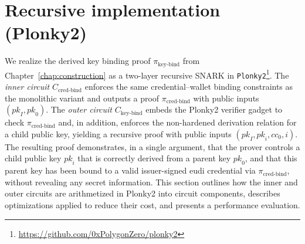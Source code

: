 \section{Recursive implementation (Plonky2)}
\label{sec:recursive-plonky2}
We realize the derived key binding proof $\pi_{\text{key-bind}}$ from Chapter~\ref{chap:construction} as a two-layer recursive SNARK in \texttt{Plonky2}\footnote{\url{https://github.com/0xPolygonZero/plonky2}}. The \emph{inner circuit} $C_{\text{cred-bind}}$ enforces the same credential–wallet binding constraints as the monolithic variant and outputs a proof $\pi_{\text{cred-bind}}$ with public inputs $(\mathit{pk}_I,\mathit{pk}_0)$. The \emph{outer circuit} $C_{\text{key-bind}}$ embeds the Plonky2 verifier gadget to check $\pi_{\text{cred-bind}}$ and, in addition, enforces the non-hardened derivation relation for a child public key, yielding a recursive proof with public inputs $(\mathit{pk}_I,\mathit{pk}_i,\mathit{cc}_0,i)$. The resulting proof demonstrates, in a single argument, that the prover controls a child public key $\mathit{pk}_i$ that is correctly derived from a parent key $\mathit{pk}_0$, and that this parent key has been bound to a valid issuer-signed \acrshort{eudi} credential via $\pi_{\text{cred-bind}}$, without revealing any secret information. This section outlines how the inner and outer circuits are arithmetized in Plonky2 into circuit components, describes optimizations applied to reduce their cost, and presents a performance evaluation.

